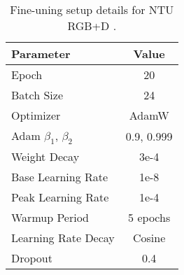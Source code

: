 \iffalse
\begin{table}[h]
    \centering
    \caption{Fine-uning setup details for NTU RGB+D \cite{ntu60Paper}.}
    \begin{tabular}{l c}
        \toprule
        \toprule
        \textbf{Parameter}            & \textbf{Value}                \\ \hline
        Epoch                         & 20                            \\ 
        Batch Size                    & 24                             \\ 
        Optimizer                     & AdamW                         \\ 
        Adam \(\beta_1\), \(\beta_2\) & 0.9, 0.999                    \\ 
        Weight Decay                  & 3e-4                          \\ 
        Base Learning Rate             & 1e-8                        \\ 
        Peak Learning Rate             & 1e-4                        \\ 
        Warmup Period                 & 5 epochs                      \\ 
        Learning Rate Decay           & Cosine                        \\ 
        Dropout                       & 0.4                           \\ \bottomrule
    \end{tabular}
    \label{tab:dt1_training_setup_nt60}
\end{table}

